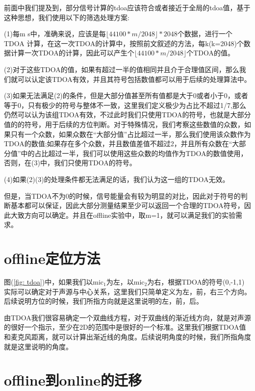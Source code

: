 \documentclass[winfonts]{njuthesis}
\begin{document}
		前面中我们提及到，部分信号计算的tdoa应该符合或者接近于全局的tdoa值，基于这种思想，我们使用以下的筛选处理方案:
		
		(1)每m s中，准确来说，应该是每$\lfloor 44100 * m / 2048 \rfloor * 2048 $个数据，进行一个TDOA 计算，在这一次TDOA的计算中，按照前文叙述的方法，每k(k=2048)个数据计算一次TDOA的计算，因此可以产生个$\lfloor 44100 * m / 2048 \rfloor$个TDOA的值。
		
		(2)对于这些TDOA的值，如果有超过一半的值相同并且介于合理值区间，那么我们就可以认定该TDOA有效，并且其符号包括数值都可以用于后续的处理算法中。
		
		(3)如果无法满足(2)的条件，但是大部分值甚至所有值都是大于0或者小于0，或者等于0，只有极少的符号与整体不一致，这里我们定义极少为占比不超过1/7,那么仍然可以认为该组TDOA有效，不过此时我们只使用TDOA的符号，也就是大部分值的的符号，用于后续的方位判断。对于特殊情况，我们考察这些数值的众数，如果只有一个众数，如果众数在“大部分值”占比超过一半，那么我们使用该众数作为TDOA的数值;如果存在多个众数，并且数值差值不超过2，并且所有众数在“大部分值”中的占比超过一半，我们可以使用这些众数的均值作为TDOA的数值使用，否则，在(3)中，我们只使用TDOA的符号。
		
		(4)如果(2)(3)的处理条件都无法满足的话，我们认为这一组的TDOA无效。
		
		但是，当TDOA不为0的时候，信号能量会有较为明显的对比，因此对于符号的判断基本都可以保证，因此大部分测量结果至少可以返回一个合理的TDOA符号，因此大致方向可以确定。并且在offline实验中，取m=1，就可以满足我们的实验需求。
		
	\section{offline定位方法}
		
		图(\ref{fig: tdoa})中，如果我们以$\text{mic}_1$为左，以$\text{mic}_2$为右，根据TDOA的符号(0,-1,1)实际可以确定对于声源与中心关系，这里我们只简单定义为左，前，右三个方向。后续说明方位的时候，我们所指方向就是这里说明的左，前，后。
	
		由TDOA我们很容易确定一个双曲线方程，对于双曲线的渐近线方向，就是对声源的很好一个指示，至少在2D的范围中是很好的一个标准。这里我们根据TDOA值和麦克风距离，就可以计算出渐近线的角度。后续说明角度的时候，我们所指角度就是这里说明的角度。
		
		
		
	
	\section{offline到online的迁移}
	
\end{document}
